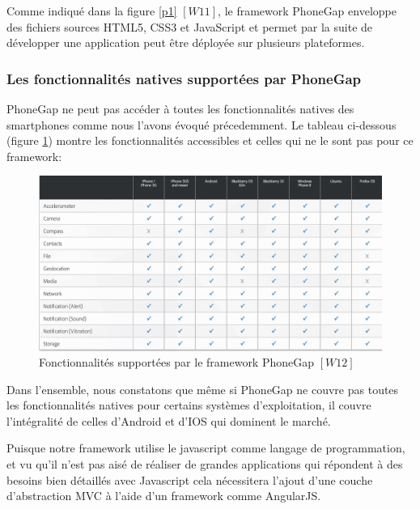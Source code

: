 Comme indiqué dans la figure \ref{p1} $[W11]$, le framework PhoneGap enveloppe des fichiers sources HTML5, CSS3 et JavaScript et permet par la suite de développer une application peut être déployée sur plusieurs plateformes.

\subsubsection{Les fonctionnalités natives supportées par PhoneGap}

PhoneGap ne peut pas accéder à toutes les fonctionnalités natives des smartphones comme nous l’avons évoqué précedemment. Le tableau ci-dessous (figure \ref{p2}) montre les fonctionnalités accessibles et celles qui ne le sont pas pour ce framework:

\begin{figure}[!ht]
\begin{center}
\includegraphics[scale=0.3]{p2.jpg}
\caption{Fonctionnalités supportées par le framework PhoneGap $[W12]$}
\label{p2}
\end{center}
\end{figure}

\vspace{6pt}
\paragraphmark

Dans l’ensemble, nous constatons que même si PhoneGap ne couvre pas toutes les fonctionnalités natives pour certains systèmes d’exploitation, il couvre l’intégralité de celles d’Android et d’IOS qui dominent le marché.

\vspace{6pt}
\paragraphmark

Puisque notre framework utilise le javascript comme langage de programmation, et vu qu’il n’est pas aisé de réaliser de grandes applications qui répondent à des besoins bien détaillés avec Javascript cela nécessitera l’ajout d’une couche d’abstraction MVC à l’aide d’un framework comme AngularJS.

